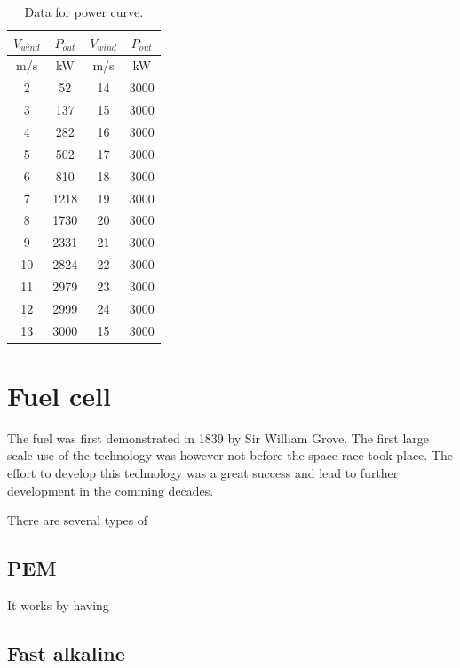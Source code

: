 \documentclass[a4paper]{report}
\begin{document}
\begin{table}[H]
    \centering
    \begin{tabular}{|c|c|c|c|}
        \hline
        $V_{wind}$  & $P_{out}$ & $V_{wind}$ & $P_{out}$\\
        \hline
        m/s & kW & m/s & kW\\
        \hline
        2   & 52     & 14    & 3000\\
        3   & 137    & 15    & 3000\\
        4   & 282    & 16    & 3000\\
        5   & 502    & 17    & 3000\\
        6   & 810    & 18    & 3000\\
        7   & 1218   & 19    & 3000\\
        8   & 1730   & 20    & 3000\\
        9   & 2331   & 21    & 3000\\
        10  & 2824   & 22    & 3000\\
        11  & 2979   & 23    & 3000\\
        12  & 2999   & 24    & 3000\\
        13  & 3000   & 15    & 3000\\
        \hline
    \end{tabular}
    \caption{Data for power curve.}
    \label{tab:Teori:power_curve}
\end{table}

\section{Fuel cell}
The fuel was first demonstrated in 1839 by Sir William Grove. The first large scale use of the technology was however not before the space race took place. The effort to develop this technology was a great success and lead to further development in the comming decades.\cite[p.
~xv]{larminie2003fuel}

There are several types of 

\subsection{PEM}

It works by having

\subsection{Fast alkaline}
\end{document}
